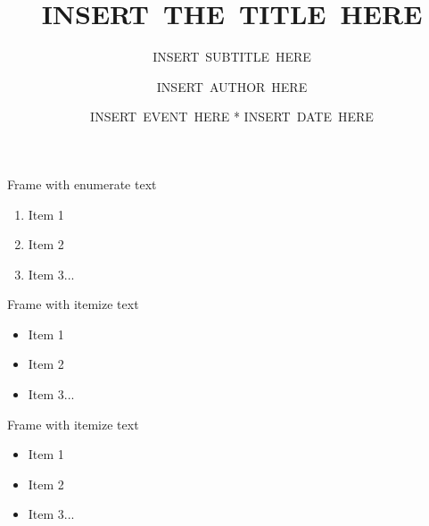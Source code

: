 \documentclass{beamer}
\title{INSERT~THE~TITLE~HERE}  %
\subtitle{INSERT~SUBTITLE~HERE}  %
\author{INSERT~AUTHOR~HERE}  %
\institute{INSERT~AFFILIATION~HERE}  %
\date{INSERT~EVENT~HERE  *   INSERT~DATE~HERE}   %
\begin{document}
\begin{frame}[plain]
	\titlepage
\end{frame}


\begin{frame}[c]{Frame with enumerate text}
\begin{enumerate}
	\item Item 1
	\item Item 2
	\item Item 3...
\end{enumerate}
\end{frame}



\begin{frame}[c]{Frame with itemize text}
\begin{itemize}
	\item Item 1
	\item Item 2
	\item Item 3...
\end{itemize}
\end{frame}



\begin{frame}[c]{Frame with itemize text}
\begin{itemize}
	\item[] Item 1
	\item[] Item 2
	\item[] Item 3...
\end{itemize}
\end{frame}
\end{document}

